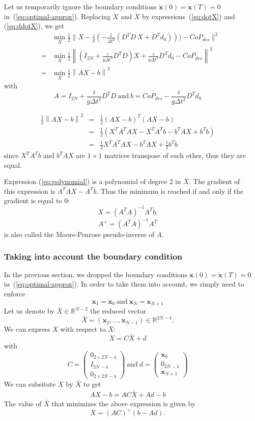 \documentclass{article}
\newcommand\vect[1]{\mathbf{#1}}
\newcommand\x{\vect{x}}
\newcommand\dx{\vect{\dot{x}}}
\newcommand\reals{\mathbb{R}}
\newcommand\Xbar{\bar{X}}
\begin{document}
Let us temporarily ignore the boundary conditions $\dx(0)=\dx(T)=0$ in~(\ref{eq:optimal-approx}).
Replacing $\dot{X}$ and $\ddot{X}$ by expressions~(\ref{eq:dotX}) and (\ref{eq:ddotX}), we get
\begin{eqnarray*}
&&  \min_{X}\frac{1}{2}\|X - \frac{z}{g}(-\frac{1}{\Delta t^2} (D^TD\,X + D^Td_0))) - CoP_{des}\|^2\\
  &=&  \min_{X}\frac{1}{2}\left\|(I_{2N} + \frac{z}{g\Delta t^2}D^TD) X + \frac{z}{g\Delta t^2}D^Td_0 - CoP_{des}\right\|^2\\
  &=& \min_{X}\frac{1}{2}\left\| AX - b \right\|^2
\end{eqnarray*}
with
$$
A = I_{2N} + \frac{z}{g\Delta t^2}D^TD\ \mbox{and}\
  b = CoP_{des} - \frac{z}{g\Delta t^2}D^Td_0
$$

\begin{eqnarray}
  \frac{1}{2}\left\| AX - b \right\|^2 &=& \frac{1}{2}(AX - b)^T(AX - b)\\
  &=& \frac{1}{2}(X^T A^TAX - X^TA^T b - b^TAX + b^Tb)\\
  \label{eq:polynomial}
  &=& \frac{1}{2} X^T A^TAX -b^TAX + \frac{1}{2}b^Tb
\end{eqnarray}
since $X^TA^T b$ and $b^TAX$ are  $1\times 1$ matrices transpose of each other, thus they are equal.

Expression (\ref{eq:polynomial}) is a polynomial of degree 2 in $X$. The gradient of this
expression is $A^TAX -A^Tb$. Thus the minimum is reached if and only if the gradient is equal to 0:
$$
X = (A^TA)^{-1}A^Tb.
$$
$$
A^{+} = (A^TA)^{-1}A^T
$$
is also called the Moore-Penrose pseudo-inverse of $A$.

\subsubsection{Taking into account the boundary condition}

In the previous section, we dropped the boundary conditions $\dx(0)=\dx(T)=0$ in~(\ref{eq:optimal-approx}). In order to take them into account, we simply need to enforce
$$
\x_{1} = \x_{0}\ \mbox{and}\ \x_{N} = \x_{N+1}
$$
Let us denote by $\Xbar\in\reals^{N-2}$ the reduced vector
$$
\Xbar = (\x_2,...,\x_{N-1})\in\reals^{2N-4}.
$$
We can express $X$ with respect to $\Xbar$:
$$
X = C\Xbar + d
$$
with
$$
C = \left(\begin{array}{c}
  0_{2\times 2N-4}\\
  I_{2N-4}\\
  0_{2\times 2N-4}
\end{array}\right)\
\mbox{and}\ d=\left(\begin{array}{c}
  \x_0\\
  0_{2N-4}\\
  \x_{N+1}
\end{array}\right)
$$
We can subsitute $X$ by $\Xbar$ to get
\begin{eqnarray*}
  AX-b = AC\Xbar+Ad - b
\end{eqnarray*}
The value of $\Xbar$ that minimizes the above expression is given by
$$
\Xbar = (AC)^{+}(b-Ad).
$$
\end{document}
